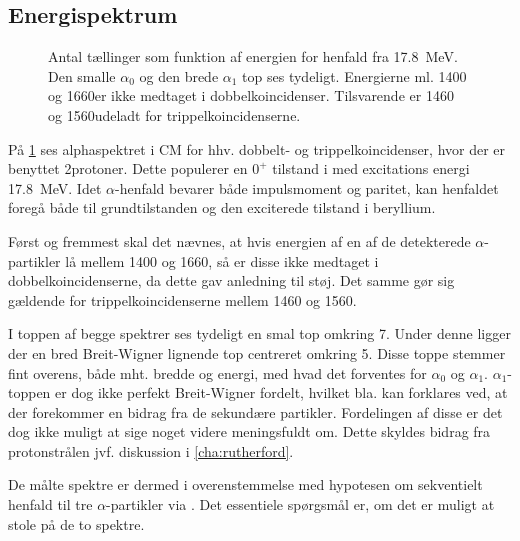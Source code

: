 \subsection{Energispektrum}
\label{sec:energispektrum}


\begin{figure}[h!]
  \centering
  \hfill
  \caption{Antal tællinger som funktion af energien for henfald fra \SI{17.8}{\MeV}. Den smalle
    $\alpha_{0}$ og den brede $\alpha_{1}$ top ses tydeligt. Energierne ml. 1400 og 1660\keV er ikke medtaget
    i dobbelkoincidenser. Tilsvarende er 1460 og 1560\keV udeladt for trippelkoincidenserne.}
  \label{fig:alphaSpectrum}
\end{figure}

På \cref{fig:alphaSpectrum} ses alphaspektret i CM for hhv. dobbelt- og trippelkoincidenser, hvor
der er benyttet 2\MeV protoner. Dette populerer en $0^{+}$ tilstand i \Carb med excitations
energi  \SI{17.8}{\MeV}. Idet $\alpha$-henfald bevarer både impulsmoment og paritet, kan henfaldet
foregå både til grundtilstanden og den exciterede tilstand i beryllium. 

Først og fremmest skal det nævnes, at hvis energien af en af de detekterede $\alpha$-partikler lå mellem
1400 og 1660\keV, så er disse ikke medtaget i dobbelkoincidenserne, da dette gav anledning til
støj. Det samme gør sig gældende for trippelkoincidenserne mellem 1460 og 1560\keV.

I toppen af begge spektrer ses tydeligt en smal top omkring 7\MeV. Under denne ligger der en bred
Breit-Wigner lignende top centreret omkring 5\MeV. Disse toppe stemmer fint overens, både
mht. bredde og energi, med hvad det forventes for $\alpha_{0}$ og $\alpha_{1}$. $\alpha_{1}$-toppen er dog ikke
perfekt Breit-Wigner fordelt, hvilket bla. kan forklares ved, at der forekommer en bidrag fra de 
sekundære partikler.
Fordelingen af disse er det dog ikke muligt at sige noget videre meningsfuldt
om. Dette skyldes bidrag fra protonstrålen jvf. diskussion i \cref{cha:rutherford}.

De målte spektre er dermed i overenstemmelse med hypotesen om sekventielt henfald til tre
$\alpha$-partikler via \Be. Det essentiele spørgsmål er, om det er muligt at stole på de to
spektre.

